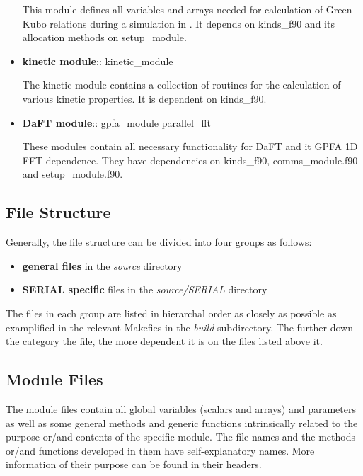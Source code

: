 \begin{itemize}
This module defines all variables and arrays needed for calculation
of Green-Kubo relations during a simulation in \D.  It depends on
{\sc kinds\_f90} and its allocation methods on {\sc setup\_module}.

\item {\bf kinetic module}:: {\sc kinetic\_module}

The kinetic module contains a collection of routines for the
calculation of various kinetic properties.
It is dependent on {\sc kinds\_f90}.

\item {\bf DaFT module}:: {\sc gpfa\_module parallel\_fft}

These modules contain all necessary functionality for \D DaFT and
it GPFA 1D FFT dependence.  They have dependencies on {\sc kinds\_f90},
{\sc comms\_module.f90} and {\sc setup\_module.f90}.

\end{itemize}

\subsection{File Structure}
\label{file-structure}

Generally, the \D file structure can be divided into four groups
as follows:
\begin{itemize}
\item {\bf general files} in the {\em source} directory
\item {\bf SERIAL specific} files in the {\em source/SERIAL} directory
\end{itemize}
The files in each group are listed in hierarchal order as closely
as possible as examplified in the relevant \D Makefies in the
{\em build} subdirectory.  The further down the category the file,
the more dependent it is on the files listed above it.

\subsection{Module Files}

The \D module files contain all global variables (scalars and
arrays) and parameters as well as some general methods and generic
functions intrinsically related to the purpose or/and contents of
the specific module.  The file-names and the methods or/and
functions developed in them have self-explanatory names.  More
information of their purpose can be found in their headers.

